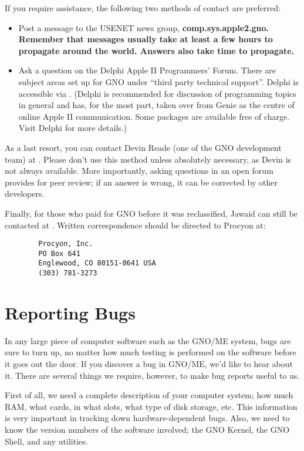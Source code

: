 \documentclass{report}
\begin{document}
If you require assistance, the following two methods of contact are
preferred:
\begin{itemize}
\item
Post a message to the USENET news group, \bf comp.sys.apple2.gno\rm.
Remember that messages usually take at least a few hours to propagate
around the world.  Answers also take time to propagate.

\item
Ask a question on the Delphi Apple II Programmers' Forum.  There
are subject areas set up for GNO under ``third party technical support''.
Delphi is accessible via .  (Delphi is
recommended for discussion of programming topics in general and
has, for the most part, taken over from Genie as the centre of 
online Apple II communication.  Some packages are available free of
charge.  Visit Delphi for more details.)
\end{itemize}

As a last resort, you can contact Devin Reade (one of the GNO
development team) at .  Please don't
use this method unless absolutely necessary, as Devin is not always
available.  More importantly, asking questions in an open forum 
provides for peer review; if an answer is wrong, it can be corrected
by other developers.

Finally, for those who paid for GNO before it was reclassified, 
Jawaid can still be contacted at
.
Written correspondence should be directed to Procyon at:

\tt \begin{verbatim}
        Procyon, Inc.
        PO Box 641
        Englewood, CO 80151-0641 USA
        (303) 781-3273
\end{verbatim} \rm 

\section{Reporting Bugs}

In any large piece of computer software
such as the GNO/ME system, bugs are sure to turn up, no matter
how much testing is performed on the software before it goes out
the door. If you discover a bug in GNO/ME, we'd like to hear
about it. There are several things we require, however, to make
bug reports useful to us.

First of all, we need a complete
description of your computer system; how much RAM, what cards, in
what slots, what type of disk storage, etc. This information is
very important in tracking down hardware-dependent bugs. Also, we
need to know the version numbers of the software involved; the
GNO Kernel, the GNO Shell, and any utilities.
\end{document}
